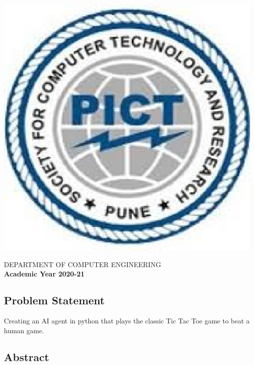 \documentclass[a4paper, 12pt]{article}
\begin{document}
\begin{titlepage}
\begin{center}
        \includegraphics[scale=0.6]{pict.eps}   
        
        \Large
        DEPARTMENT OF COMPUTER ENGINEERING\\
        \textbf{Academic Year 2020-21}
        
    \end{center}
\end{titlepage}
\pagebreak

\newpage
\tableofcontents

\newpage
{}
\begin{center}
    \section{Problem Statement}
    Creating an AI agent in python that plays the classic Tic Tac Toe game to beat a human game.

\end{center}


\newpage
\begin{center}
    \section{Abstract}
\end{center}
\end{document}
